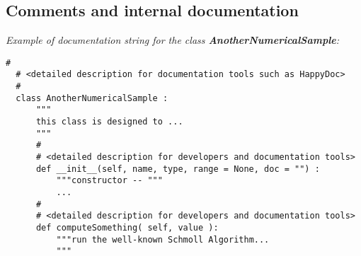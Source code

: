 \subsection{Comments and internal documentation}
\emph{Example of documentation string for the class {\bf AnotherNumericalSample}:}
\lstset{language=Python, basicstyle=\normalsize}
\begin{lstlisting}[frame=TBRL]
  #
  # <detailed description for documentation tools such as HappyDoc>
  #
  class AnotherNumericalSample :
      """
      this class is designed to ...
      """
      #
      # <detailed description for developers and documentation tools>
      def __init__(self, name, type, range = None, doc = "") :
          """constructor -- """
          ...
      #
      # <detailed description for developers and documentation tools>
      def computeSomething( self, value ):
          """run the well-known Schmoll Algorithm...
          """
\end{lstlisting}
